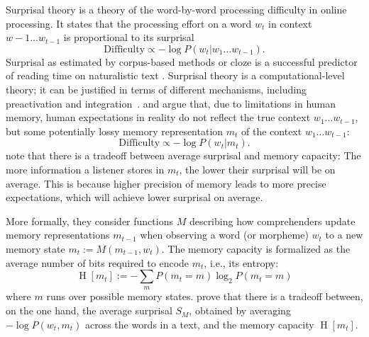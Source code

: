 \documentclass[11pt,letterpaper]{article}
\newcommand{\citep}{\parencite}
\newcommand{\citet}{\Textcite}
\newcommand\mhahn[1]{{\color{red}(#1)}}
\begin{document}
Surprisal theory \citep{hale2001probabilistic, levy2008expectation} is a theory of the word-by-word processing difficulty in online processing.
It states that the processing effort on a word $w_t$ in context $w-1 ... w_{t-1}$ is proportional to its surprisal
     \begin{equation}   \label{eq:true-surp}
    \text{Difficulty} \propto -\log P(w_t | w_1\dots w_{t-1}).
\end{equation}
Surprisal as estimated by corpus-based methods or cloze is a successful predictor of reading time on naturalistic text \citep{smith2013effect,goodkind-predictive-2018,frank2019interaction,aurnhammer2019evaluating,wilcox2020predictive}. %
Surprisal theory is a computational-level theory; it can be justified in terms of different mechanisms, including preactivation and integration~\citep{kuperberg2016we}.
\citet{futrell-noisy-context-2017-1} and \citet{Hahn2020modeling} argue that, due to limitations in human memory, human expectations in reality do not reflect the true context $w_1\dots w_{t-1}$, but some potentially lossy memory representation $m_t$ of the context $w_1\dots w_{t-1}$:
\begin{equation}   \label{eq:lossy-surp}
    \text{Difficulty} \propto -\log P(w_t | m_t).
\end{equation}
\citet{Hahn2020modeling} note that there is a tradeoff between average surprisal and memory capacity:
The more information a listener stores in $m_t$, the lower their surprisal will be on average.
This is because higher precision of memory leads to more precise expectations, which will achieve lower surprisal on average.

More formally, they consider functions $M$ describing how comprehenders update memory representations $m_{t-1}$ when observing a word (or morpheme) $w_t$ to a new memory state $m_t := M(m_{t-1}, w_t)$.
The memory capacity is formalized as the average number of bits required to encode $m_t$, i.e., its entropy:
\begin{equation*}
    \operatorname{H}[m_t] := - \sum_m P(m_t = m) \log_2 P(m_t=m)
\end{equation*}
where $m$ runs over possible memory states.
\citet{Hahn2020modeling} prove that there is a tradeoff between, on the one hand, the average surprisal $S_M$, obtained by averaging $- \log P(w_t , m_t)$ across the words in a text, and the memory capacity $\operatorname{H}[m_t]$.

\end{document}
